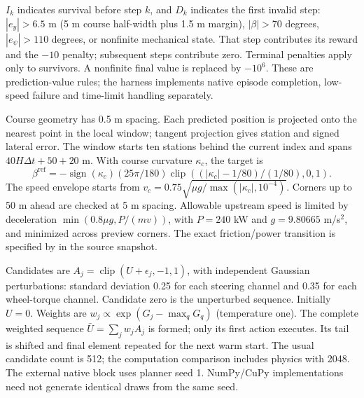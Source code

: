\documentclass[11pt]{article}
\newcommand{\src}[1]{\texttt{\detokenize{#1}}}
\begin{document}
$I_k$ indicates survival before step $k$, and $D_k$ indicates the first invalid step: $|e_y|>6.5$ m (5 m course half-width plus 1.5 m margin), $|\beta|>70$ degrees, $|e_\psi|>110$ degrees, or nonfinite mechanical state. That step contributes its reward and the $-10$ penalty; subsequent steps contribute zero. Terminal penalties apply only to survivors. A nonfinite final value is replaced by $-10^6$. These are prediction-value rules; the harness implements native episode completion, low-speed failure and time-limit handling separately.

Course geometry has 0.5 m spacing. Each predicted position is projected onto the nearest point in the local window; tangent projection gives station and signed lateral error. The window starts ten stations behind the current index and spans $40H\Delta t+50+20$ m. With course curvature $\kappa_c$, the target is
\[
\beta^{\mathrm{ref}}=-\operatorname{sign}(\kappa_c)(25\pi/180)
\operatorname{clip}((|\kappa_c|-1/80)/(1/80),0,1).
\]
The speed envelope starts from $v_c=0.75\sqrt{\mu g/\max(|\kappa_c|,10^{-4})}$. Corners up to 50 m ahead are checked at 5 m spacing. Allowable upstream speed is limited by deceleration $\min(0.8\mu g,P/(mv))$, with $P=240$ kW and $g=9.80665$ m/s$^2$, and minimized across preview corners. The exact friction/power transition is specified by \src{envelope_vlim} in the source snapshot.

Candidates are $A_j=\operatorname{clip}(U+\epsilon_j,-1,1)$, with independent Gaussian perturbations: standard deviation 0.25 for each steering channel and 0.35 for each wheel-torque channel. Candidate zero is the unperturbed sequence. Initially $U=0$. Weights are $w_j\propto\exp(G_j-\max_qG_q)$ (temperature one). The complete weighted sequence $\bar U=\sum_jw_jA_j$ is formed; only its first action executes. Its tail is shifted and final element repeated for the next warm start. The usual candidate count is 512; the computation comparison includes physics with 2048. The external native block uses planner seed 1. NumPy/CuPy implementations need not generate identical draws from the same seed.
\end{document}
